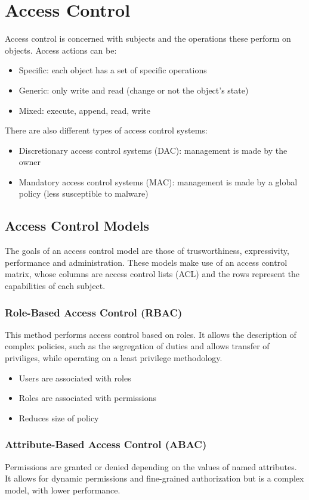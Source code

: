 \documentclass[10pt,a4paper]{report}
\begin{document}
\section{Access Control}
Access control is concerned with subjects and the operations these perform on objects. Access actions can be:
\begin{itemize}
\item Specific: each object has a set of specific operations
\item Generic: only write and read (change or not the object's state)
\item Mixed: execute, append, read, write
\end{itemize}
There are also different types of access control systems:
\begin{itemize}
\item Discretionary access control systems (DAC): management is made by the owner
\item Mandatory access control systems (MAC): management is made by a global policy (less susceptible to malware)
\end{itemize}
\subsection{Access Control Models}
The goals of an access control model are those of trusworthiness, expressivity, performance and administration. These models make use of an access control matrix, whose columns are access control lists (ACL) and the rows represent the capabilities of each subject.
\subsubsection{Role-Based Access Control (RBAC)}
This method performs access control based on roles. It allows the description of complex policies, such as the segregation of duties and allows transfer of priviliges, while operating on a least privilege methodology.
\begin{itemize}
\item Users are associated with roles
\item Roles are associated with permissions
\item Reduces size of policy
\end{itemize}
\subsubsection{Attribute-Based Access Control (ABAC)}
Permissions are granted or denied depending on the values of named attributes. It allows for dynamic permissions and fine-grained authorization but is a complex model, with lower performance.
\end{document}
